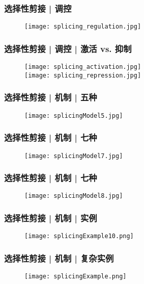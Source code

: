 \begin{frame}
  \frametitle{选择性剪接 | 调控}
  \begin{figure}
    \centering
    \texttt{[image: splicing\_regulation.jpg]}
  \end{figure}
\end{frame}

\begin{frame}
  \frametitle{选择性剪接 | 调控 | 激活 vs. 抑制}
  \begin{figure}
    \centering
    \texttt{[image: splicing\_activation.jpg]}\\
    \vspace{1em}
    \texttt{[image: splicing\_repression.jpg]}
  \end{figure}
\end{frame}

\begin{frame}
  \frametitle{选择性剪接 | \alert{机制} | 五种}
  \begin{figure}
    \centering
    \texttt{[image: splicingModel5.jpg]}
  \end{figure}
\end{frame}

\begin{frame}
  \frametitle{选择性剪接 | \alert{机制} | 七种}
  \begin{figure}
    \centering
    \texttt{[image: splicingModel7.jpg]}
  \end{figure}
\end{frame}

\begin{frame}
  \frametitle{选择性剪接 | \alert{机制} | 七种}
  \begin{figure}
    \centering
    \texttt{[image: splicingModel8.jpg]}
  \end{figure}
\end{frame}

\begin{frame}
  \frametitle{选择性剪接 | 机制 | 实例}
  \begin{figure}
    \centering
    \texttt{[image: splicingExample10.png]}
  \end{figure}
\end{frame}

\begin{frame}
  \frametitle{选择性剪接 | 机制 | 复杂实例}
  \begin{figure}
    \centering
    \texttt{[image: splicingExample.png]}
  \end{figure}
\end{frame}

